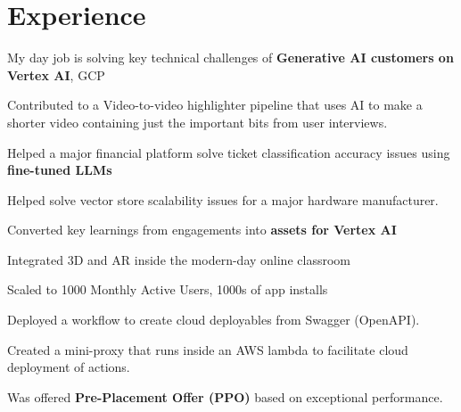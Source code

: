 \documentclass[]{deedy-resume-openfont}
\begin{document}
\begin{minipage}[t]{0.66\textwidth} 




\section{Experience}
\vspace{\topsep} %
\begin{tightemize}
\item My day job is solving key technical challenges of \textbf{Generative AI customers on Vertex AI}, GCP\\
\item Contributed to a Video-to-video highlighter pipeline that uses AI to make a shorter video containing just the important bits from user interviews.
\item Helped a major financial platform solve ticket classification accuracy issues using \textbf{fine-tuned LLMs}
\item Helped solve vector store scalability issues for a major hardware manufacturer.
\item Converted key learnings from engagements into \textbf{assets for Vertex AI}
\end{tightemize}

\begin{tightemize}
\item Integrated 3D and AR inside the modern-day online classroom   
\item Scaled to 1000 Monthly Active Users, 1000s of app installs
\end{tightemize}

\begin{tightemize}
\item Deployed a workflow to create cloud deployables from Swagger (OpenAPI).
\item Created a mini-proxy that runs inside an AWS lambda to facilitate cloud deployment of actions.
\item Was offered \textbf{Pre-Placement Offer (PPO)} based on exceptional performance.
\end{tightemize}


\end{minipage}
\end{document}
